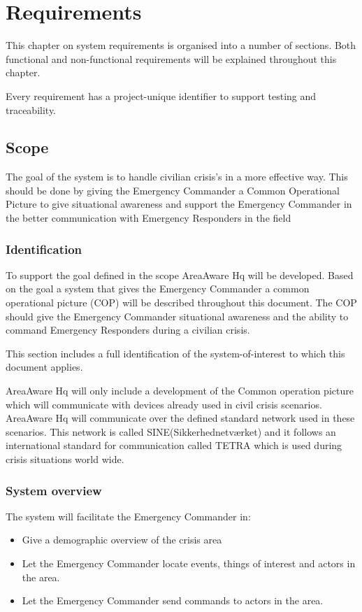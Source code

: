 \label{chp_requirements}
\chapter{Requirements}
This chapter on system requirements is organised into a number of sections. Both functional and non-functional requirements will be explained throughout this chapter.

Every requirement has a project-unique identifier to support testing and traceability.

\section{Scope}
The goal of the system is to handle civilian crisis's in a more effective way. This should be done by giving the Emergency Commander a Common Operational Picture to give situational awareness and support the Emergency Commander in the better communication with Emergency Responders in the field

\subsection{Identification}
To support the goal defined in the scope AreaAware Hq will be developed. Based on the goal a system that gives the Emergency Commander a common operational picture (COP) will be described throughout this document. The COP should give the Emergency Commander situational awareness and the ability to command Emergency Responders during a civilian crisis. 

This section includes a full identification of the system-of-interest to which this document applies.

AreaAware Hq will only include a development of the Common operation picture which will communicate with devices already used in civil crisis scenarios. AreaAware Hq will communicate over the defined standard network used in these scenarios. This network is called SINE(Sikkerhednetværket) and it follows an international standard for communication called TETRA which is used during crisis situations world wide. 

\subsection{System overview}
The system will facilitate the Emergency Commander in:
\begin{itemize}
	\item Give a demographic overview of the crisis area
	\item Let the Emergency Commander locate events, things of interest and actors in the area.
	\item Let the Emergency Commander send commands to actors in the area.
\end{itemize}

